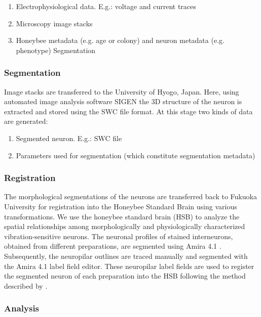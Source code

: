 \documentclass{frontiersSCNS} %
\begin{document}
\begin{enumerate}
\item Electrophysiological data. E.g.: voltage and current traces
\item Microscopy image stacks
\item Honeybee metadata (e.g. age or colony) and neuron metadata (e.g. phenotype) Segmentation
\end{enumerate}

\subsubsection{Segmentation}

Image stacks are transferred to the University of Hyogo, Japan. Here, using
automated image analysis software SIGEN \citep{Yamasaki2006, Minemoto} the 3D structure of the neuron is extracted and stored using the
SWC file format. At this stage two kinds of data are generated:

\begin{enumerate}
\item Segmented neuron. E.g.: SWC file
\item Parameters used for segmentation (which constitute segmentation metadata)
\end{enumerate}


\subsubsection{Registration}

The morphological segmentations of the neurons are transferred back to Fukuoka
University for registration into the Honeybee Standard Brain using various
transformations. We use the honeybee standard brain (HSB) to analyze the
spatial relationships among morphologically and physiologically characterized
vibration-sensitive neurons. The neuronal profiles of stained interneurons,
obtained from different preparations, are segmented  using Amira 4.1
\citep{Evers2005}. Subsequently, the neuropilar outlines are traced manually and
segmented with the Amira 4.1 label field editor. These neuropilar label fields
are used to register the segmented neuron of each preparation into the HSB
following the method described by \citet{Brandt2005}.


\subsubsection{Analysis}
\end{document}
